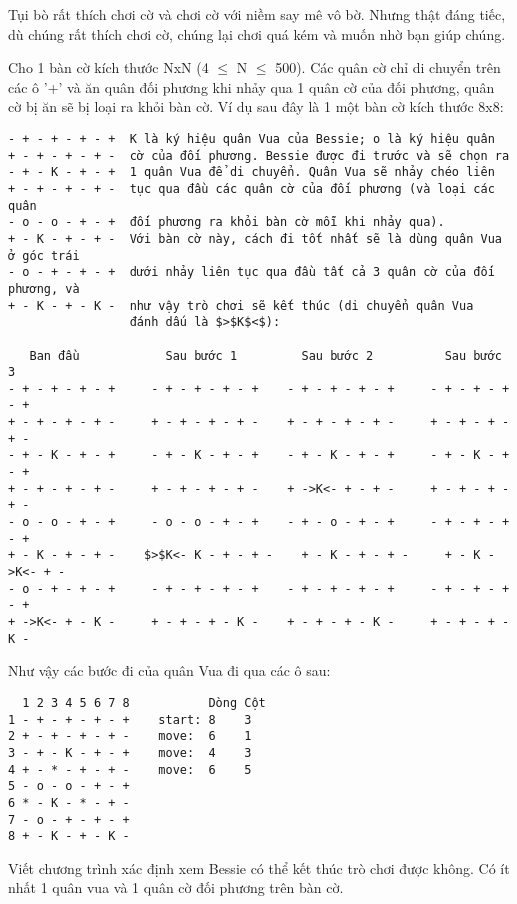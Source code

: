 Tụi bò rất thích chơi cờ và chơi cờ với niềm say mê vô bờ. Nhưng thật đáng tiếc, dù chúng rất thích chơi cờ, chúng lại chơi  quá kém và muốn nhờ bạn giúp chúng.  

   Cho 1 bàn cờ kích thước NxN (4  $\le$  N  $\le$  500).  Các quân cờ chỉ di chuyển trên các ô '+' và ăn quân đối phương khi nhảy qua 1 quân cờ của đối phương, quân cờ bị ăn sẽ bị loại ra khỏi bàn cờ. Ví dụ sau đây là 1 một bàn cờ kích thước 8x8:  
\begin{verbatim}
- + - + - + - +  K là ký hiệu quân Vua của Bessie; o là ký hiệu quân
+ - + - + - + -  cờ của đối phương. Bessie được đi trước và sẽ chọn ra 
- + - K - + - +  1 quân Vua để di chuyển. Quân Vua sẽ nhảy chéo liên 
+ - + - + - + -  tục qua đầu các quân cờ của đối phương (và loại các quân 
- o - o - + - +  đối phương ra khỏi bàn cờ mỗi khi nhảy qua).
+ - K - + - + -  Với bàn cờ này, cách đi tốt nhất sẽ là dùng quân Vua ở góc trái 
- o - + - + - +  dưới nhảy liên tục qua đầu tất cả 3 quân cờ của đối phương, và 
+ - K - + - K -  như vậy trò chơi sẽ kết thúc (di chuyển quân Vua
                 đánh dấu là $>$K$<$):

   Ban đầu            Sau bước 1         Sau bước 2          Sau bước 3
- + - + - + - +     - + - + - + - +    - + - + - + - +     - + - + - + - +
+ - + - + - + -     + - + - + - + -    + - + - + - + -     + - + - + - + -
- + - K - + - +     - + - K - + - +    - + - K - + - +     - + - K - + - +
+ - + - + - + -     + - + - + - + -    + ->K<- + - + -     + - + - + - + -
- o - o - + - +     - o - o - + - +    - + - o - + - +     - + - + - + - +
+ - K - + - + -    $>$K<- K - + - + -    + - K - + - + -     + - K ->K<- + -
- o - + - + - +     - + - + - + - +    - + - + - + - +     - + - + - + - +
+ ->K<- + - K -     + - + - + - K -    + - + - + - K -     + - + - + - K -
\end{verbatim}

   Như vậy các bước đi của quân Vua đi qua các ô sau:  
\begin{verbatim}
  1 2 3 4 5 6 7 8           Dòng Cột
1 - + - + - + - +    start: 8    3
2 + - + - + - + -    move:  6    1
3 - + - K - + - +    move:  4    3
4 + - * - + - + -    move:  6    5
5 - o - o - + - +
6 * - K - * - + - 
7 - o - + - + - + 
8 + - K - + - K - 
\end{verbatim}

   Viết chương trình xác định xem Bessie có thể kết thúc trò chơi được không. Có ít nhất 1 quân vua và 1 quân cờ đối phương trên bàn cờ.